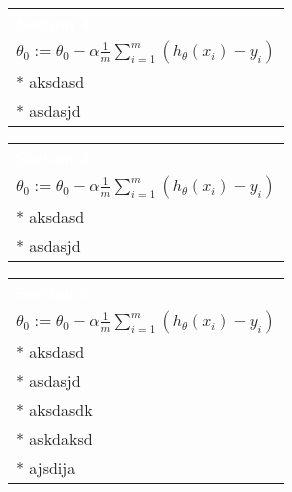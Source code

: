 \documentclass[a4paper,12pt,ngerman,fleqn]{article}
\newcommand{\mybox}[3]{
        \centering
        \begin{tabularx}{0.9\textwidth}{|X|}
            \rowcolor{accent}
            \textcolor{white}{\textbf{#1}} \\
            #2
            \\ \hline
            #3
            \\ \hline
        \end{tabularx}
    }
\begin{document}
    \begin{minipage}[t]{.51\textwidth}
        \vspace{1pt}
        \mybox
            {Section 4}
            {\( \theta_0 := \theta_0 - \alpha \frac{1}{m} \sum\limits_{i=1}^{m}(h_\theta(x_{i}) - y_{i}) \)}
            {
                * aksdasd \\
                * asdasjd
            }
        \newline
        \newline
        \newline
        \mybox
            {Section 5}
            {\( \theta_0 := \theta_0 - \alpha \frac{1}{m} \sum\limits_{i=1}^{m}(h_\theta(x_{i}) - y_{i}) \)}
            {
                * aksdasd \\
                * asdasjd
            }
        \newline
        \newline
        \newline
        \mybox
            {Section 6}
            {\( \theta_0 := \theta_0 - \alpha \frac{1}{m} \sum\limits_{i=1}^{m}(h_\theta(x_{i}) - y_{i}) \)}
            {
                * aksdasd \\
                * asdasjd \\
                * aksdasdk \\
                * askdaksd \\
                * ajsdija
            }
        \newline
    \end{minipage}
    
\end{document}
